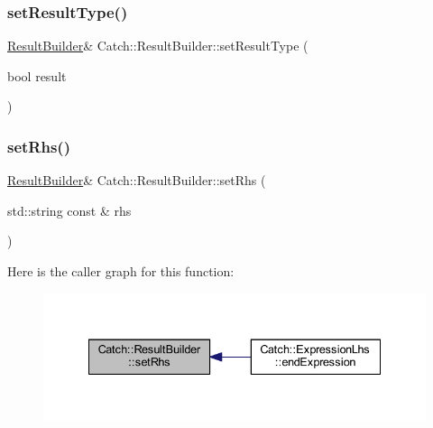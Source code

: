 \subsubsection{\texorpdfstring{set\+Result\+Type()}{setResultType()}\hspace{0.1cm}{\footnotesize\ttfamily [2/2]}}
{\footnotesize\ttfamily \hyperlink{class_catch_1_1_result_builder}{Result\+Builder}\& Catch\+::\+Result\+Builder\+::set\+Result\+Type (\begin{DoxyParamCaption}\item[{bool}]{result }\end{DoxyParamCaption})}

\hypertarget{class_catch_1_1_result_builder_aaeb41a00cf352c7a0bcf75a0ded0a4a2}{}\label{class_catch_1_1_result_builder_aaeb41a00cf352c7a0bcf75a0ded0a4a2} 
\subsubsection{\texorpdfstring{set\+Rhs()}{setRhs()}}
{\footnotesize\ttfamily \hyperlink{class_catch_1_1_result_builder}{Result\+Builder}\& Catch\+::\+Result\+Builder\+::set\+Rhs (\begin{DoxyParamCaption}\item[{std\+::string const \&}]{rhs }\end{DoxyParamCaption})}

Here is the caller graph for this function\+:\nopagebreak
\begin{figure}[H]
\begin{center}
\leavevmode
\includegraphics[width=335pt]{class_catch_1_1_result_builder_aaeb41a00cf352c7a0bcf75a0ded0a4a2_icgraph}
\end{center}
\end{figure}
\hypertarget{class_catch_1_1_result_builder_a6f2b0dbcc6cc5e0a500ac45f2534e3e7}{}\label{class_catch_1_1_result_builder_a6f2b0dbcc6cc5e0a500ac45f2534e3e7} 
